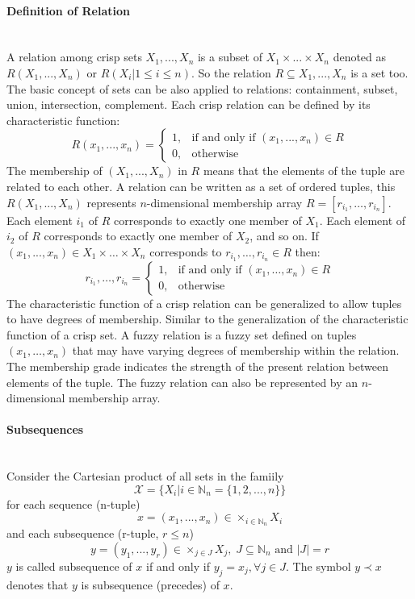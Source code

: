 \documentclass{article}
\begin{document}
\paragraph{Definition of Relation}\mbox{}\\
A relation among crisp sets $X_1,...,X_n$ is a subset of $X_1\times ...\times X_n$ denoted as
$R(X_1,...,X_n)$ or $R(X_i|1\leq i\leq n)$. So the relation $R\subseteq X_1,...,X_n$ is a set too.
The basic concept of sets can be also applied to relations: containment, subset, union, intersection, complement.
Each crisp relation can be defined by its characteristic function:
\[
    R(x_1,...,x_n)=
    \begin{cases}
        1, & \text{if and only if }(x_1,...,x_n)\in R \\
        0, & \text{otherwise}
    \end{cases}
\]
The membership of $(X_1,...,X_n)$ in $R$ means that the elements of the tuple are related to each other.
A relation can be written as a set of ordered tuples, this $R(X_1,...,X_n)$ represents $n$-dimensional
membership array $R=[r_{i_1},\dots,r_{i_n}]$. Each element $i_1$ of $R$ corresponds to exactly one
member of $X_1$. Each element of $i_2$ of $R$ corresponds to exactly one member of $X_2$, and so on.
\newline\newline
If $(x_1,...,x_n)\in X_1\times\dots\times X_n$ corresponds to $r_{i_1},\dots,r_{i_{n}}\in R$ then:
\[
    r_{i_1},\dots,r_{i_{n}}=
    \begin{cases}
        1, & \text{if and only if }(x_1,\dots,x_n)\in R \\
        0, & \text{otherwise}
    \end{cases}
\]
The characteristic function of a crisp relation can be generalized to allow tuples to have degrees of
membership. Similar to the generalization of the characteristic function of a crisp set. A fuzzy relation
is a fuzzy set defined on tuples $(x_1,\dots,x_n)$ that may have varying degrees of membership within
the relation.
\newline\newline
The membership grade indicates the strength of the present relation between elements of the tuple. The
fuzzy relation can also be represented by an $n$-dimensional membership array.

\paragraph{Subsequences}\mbox{}\\
Consider the Cartesian product of all sets in the famiily
$$\mathcal{X}=\{X_i|i\in\mathbb{N}_n =\{1,2,...,n\}\}$$
for each sequence (n-tuple)
$$x=(x_1,...,x_n)\in\times_{i\in\mathbb{N}_n}X_i$$
and each subsequence (r-tuple, $r\leq n$)
$$y=(y_1,...,y_r)\in\times_{j\in J}X_j,\;J\subseteq\mathbb{N}_n\text{ and }|J|=r$$
$y$ is called subsequence of $x$ if and only if $y_j=x_j,\forall j\in J$. The symbol $y\prec x$ denotes
that $y$ is subsequence (precedes) of $x$.
\end{document}
